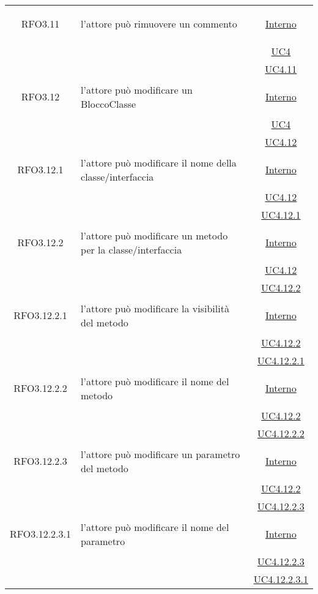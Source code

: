 \begin{longtable}{|c|>{\centering}m{7cm}|c|}
\hypertarget{RFO3.11}{RFO3.11} & l'attore può rimuovere un commento &  \hyperlink{Interno}{Interno}\\
& &\hyperref[UC4]{UC4}\\
& &\hyperref[UC4.11]{UC4.11}\\ \hline
\hypertarget{RFO3.12}{RFO3.12} & l'attore può modificare un BloccoClasse &  \hyperlink{Interno}{Interno}\\
& &\hyperref[UC4]{UC4}\\
& &\hyperref[UC4.12]{UC4.12}\\ \hline

\hypertarget{RFO3.12.1}{RFO3.12.1} & l'attore può modificare il nome della classe/interfaccia & \hyperlink{Interno}{Interno}\\
& &\hyperref[UC4.12]{UC4.12}\\
& &\hyperref[UC4.12.1]{UC4.12.1}\\ \hline

\hypertarget{RFO3.12.2}{RFO3.12.2} & l'attore può modificare un metodo per la classe/interfaccia & \hyperlink{Interno}{Interno}\\
& &\hyperref[UC4.12]{UC4.12}\\
& &\hyperref[UC4.12.2]{UC4.12.2}\\ \hline

\hypertarget{RFO3.12.2.1}{RFO3.12.2.1} & l'attore può modificare la visibilità del metodo & \hyperlink{Interno}{Interno}\\
& &\hyperref[UC4.12.2]{UC4.12.2}\\
& &\hyperref[UC4.12.2.1]{UC4.12.2.1}\\ \hline

\hypertarget{RFO3.12.2.2}{RFO3.12.2.2} & l'attore può modificare il nome del metodo & \hyperlink{Interno}{Interno}\\
& &\hyperref[UC4.12.2]{UC4.12.2}\\
& &\hyperref[UC4.12.2.2]{UC4.12.2.2}\\ \hline

\hypertarget{RFO3.12.2.3}{RFO3.12.2.3} & l'attore può modificare un parametro del metodo & \hyperlink{Interno}{Interno}\\
& &\hyperref[UC4.12.2]{UC4.12.2}\\
& &\hyperref[UC4.12.2.3]{UC4.12.2.3}\\ \hline

\hypertarget{RFO3.12.2.3.1}{RFO3.12.2.3.1} & l'attore può modificare il nome del parametro & \hyperlink{Interno}{Interno}\\
& &\hyperref[UC4.12.2.3]{UC4.12.2.3}\\
& &\hyperref[UC4.12.2.3.1]{UC4.12.2.3.1}\\ \hline


\end{longtable}
